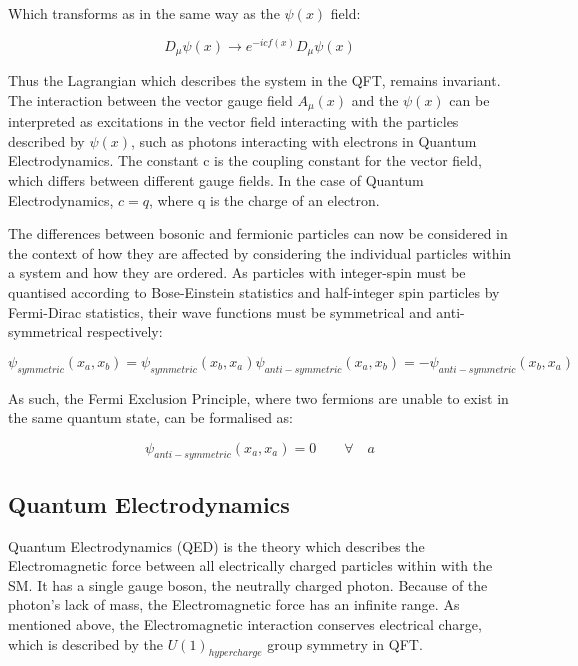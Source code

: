 Which transforms as in the same way as the $\psi(x)$ field:

\begin{equation}
D_{\mu}\psi(x) \rightarrow e^{-icf(x)}D_{\mu}\psi(x)
\end{equation}

Thus the Lagrangian which describes the system in the QFT, remains invariant. 
The interaction between the vector gauge field $A_{\mu}(x)$ and the $\psi(x)$ can be interpreted as excitations in the vector field interacting with the particles described by $\psi(x)$, such as photons interacting with electrons in Quantum Electrodynamics. 
The constant c is the coupling constant for the vector field, which differs between different gauge fields. 
In the case of Quantum Electrodynamics, $c = q$, where q is the charge of an electron\cite{QFT}.

The differences between bosonic and fermionic particles can now be considered in the context of how they are affected by considering the individual particles within a system and how they are ordered. 
As particles with integer-spin must be quantised according to Bose-Einstein statistics and half-integer spin particles by Fermi-Dirac statistics, their wave functions must be symmetrical and anti-symmetrical respectively\cite{QM}:

\begin{equation}
\psi_{symmetric}(x_{a},x_{b}) = \psi_{symmetric}(x_{b},x_{a})
\psi_{anti-symmetric}(x_{a},x_{b}) = -\psi_{anti-symmetric}(x_{b},x_{a})
\end{equation}

As such, the Fermi Exclusion Principle, where two fermions are unable to exist in the same quantum state, can be formalised as\cite{QM}:

\begin{equation}
\psi_{anti-symmetric}(x_{a},x_{a}) = 0 \qquad \forall \quad a
\end{equation}

\subsection{Quantum Electrodynamics}\label{subsec:QED}
Quantum Electrodynamics (QED) is the theory which describes the Electromagnetic force between all electrically charged particles within with the SM. 
It has a single gauge boson, the neutrally charged photon. 
Because of the photon's lack of mass, the Electromagnetic force has an infinite range. 
As mentioned above, the Electromagnetic interaction conserves electrical charge, which is described by the $U(1)_{hypercharge}$ group symmetry in QFT\cite{QFT}. 

